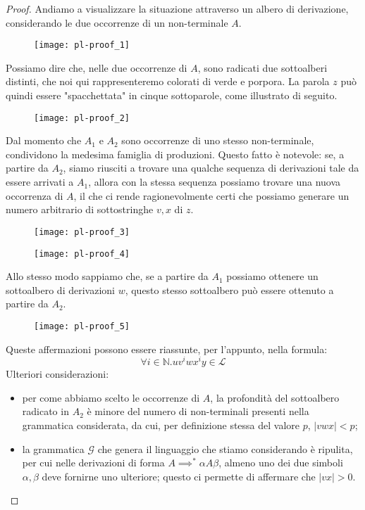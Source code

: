 \documentclass[class=book, crop=false, oneside, 12pt]{standalone}
\begin{document}
\begin{proof}
  Andiamo a visualizzare la situazione attraverso un albero di derivazione, considerando le due occorrenze di un non-terminale \(A\).
  \begin{figure}
    \centering
    \texttt{[image: pl-proof\_1]}
  \end{figure}
  Possiamo dire che, nelle due occorrenze di \(A\), sono radicati due sottoalberi distinti, che noi qui rappresenteremo colorati di verde e porpora. La parola \(z\) può quindi essere "spacchettata" in cinque sottoparole, come illustrato di seguito.
  \begin{figure}
    \centering
    \texttt{[image: pl-proof\_2]}
  \end{figure}
  Dal momento che \(A_1\) e \(A_2\) sono occorrenze di uno stesso non-terminale, condividono la medesima famiglia di produzioni. Questo fatto è notevole: se, a partire da \(A_2\), siamo riusciti a trovare una qualche sequenza di derivazioni tale da essere arrivati a \(A_1\), allora con la stessa sequenza possiamo trovare una nuova occorrenza di \(A\), il che ci rende ragionevolmente certi che possiamo generare un numero arbitrario di sottostringhe \(v, x\) di \(z\).
  \begin{figure}[H]
    \centering
    \begin{minipage}{0.25\textwidth}
      \centering
      \texttt{[image: pl-proof\_3]}
    \end{minipage}
     \hfill
    \begin{minipage}{0.25\textwidth}
      \centering
      \texttt{[image: pl-proof\_4]}
    \end{minipage}
  \end{figure}
  Allo stesso modo sappiamo che, se a partire da \(A_1\) possiamo ottenere un sottoalbero di derivazioni \(w\), questo stesso sottoalbero può essere ottenuto a partire da \(A_2\).
  \begin{figure}
    \centering
    \texttt{[image: pl-proof\_5]}
  \end{figure}
  Queste affermazioni possono essere riassunte, per l'appunto, nella formula:
  \begin{equation*}
    \forall i \in \mathbb{N}.uv^iwx^iy \in \mathcal{L}
  \end{equation*}
  Ulteriori considerazioni:
   \begin{itemize}
     \item per come abbiamo scelto le occorrenze di \(A\), la profondità del sottoalbero radicato in \(A_2\) è minore del numero di non-terminali presenti nella grammatica considerata, da cui, per definizione stessa del valore \(p\), \(|vwx| < p\);
     \item la grammatica \(\mathcal{G}\) che genera il linguaggio che stiamo considerando è ripulita, per cui nelle derivazioni di forma \(A \implies^* \alpha A \beta\), almeno uno dei due simboli \(\alpha, \beta\) deve fornirne uno ulteriore; questo ci permette di affermare che \(|vx| > 0\).
   \end{itemize}


\end{proof}
\end{document}
